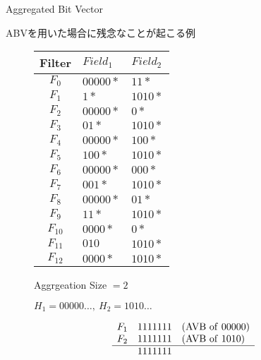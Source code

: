 \documentclass[12pt,dvipdfmx,mathserif,uplatex,aspectratio=32]{beamer}
\makeatletter
\newcommand{\tblcaption}[1]{\def\@captype{table}\caption{#1}}
\makeatother
\begin{document}
\begin{frame}{Aggregated Bit Vector}

\noindent ABVを用いた場合に残念なことが起こる例

\begin{figure}[h]
 \def\@captype{table}
 \begin{minipage}[t]{.4\textwidth}
  {\footnotesize
  {\centering
  \begin{tabular}{c|l|l} 
   Filter   & $Field_{1}$ & $Field_{2}$ \\ \hline
   $F_{0} $ & $00000*$    & $11*$   \\ \hline
   $F_{1} $ & $1*$        & $1010*$  \\ \hline
   $F_{2} $ & $00000*$    & $0*$    \\ \hline
   $F_{3} $ & $01*$       & $1010*$  \\ \hline
   $F_{4} $ & $00000*$    & $100*$   \\ \hline
   $F_{5} $ & $100*$      & $1010*$  \\ \hline
   $F_{6} $ & $00000*$    & $000*$  \\ \hline
   $F_{7} $ & $001*$      & $1010*$  \\ \hline
   $F_{8} $ & $00000*$    & $01*$   \\ \hline
   $F_{9} $ & $11*$      & $1010*$  \\ \hline
   $F_{10} $ & $0000*$    & $0*$   \\ \hline
   $F_{11} $ & $010$      & $1010*$  \\ \hline
   $F_{12} $ & $0000*$    & $1010*$   
  \end{tabular}

  }
  }
  \end{minipage}
  \hfill
  \begin{minipage}[c]{.55\textwidth}
  Aggrgeation Size $= 2$
  \par
  \vspace{5mm}

  $H_{1} = 00000 \dots, \ H_{2} = 1010 \dots $

   \begin{equation*}
    \begin{array}{lll}
     F_{1} & 1111111 & ({\rm AVB \ of \ } 00000) \\
     F_{2} & 1111111 & ({\rm AVB \ of \ } 1010) \\ \hline
           & 1111111 & 
    \end{array}
   \end{equation*}


\end{minipage}
\end{figure}
\end{frame}
\end{document}
